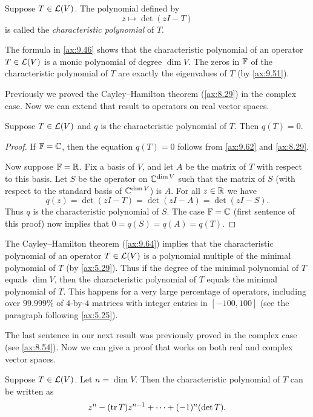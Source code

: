 \begin{definition}\label{ax:9.63}
Suppose $T\in\mathcal{L}(V)$. The polynomial defined by
\[ z\mapsto\det(zI-T) \]
is called the \emph{characteristic polynomial} of $T$.
\end{definition}

The formula in \ref{ax:9.46} shows that the characteristic polynomial of an
operator $T\in\mathcal{L}(V)$ is a monic polynomial of degree $\dim V$. The zeros in
$\mathbb{F}$ of the characteristic polynomial of $T$ are exactly the eigenvalues of $T$
(by \ref{ax:9.51}).

Previously we proved the Cayley--Hamilton theorem (\ref{ax:8.29}) in the
complex case. Now we can extend that result to operators on real vector spaces.

\begin{result}\label{ax:9.64}
Suppose $T\in\mathcal{L}(V)$ and $q$ is the characteristic polynomial of $T$. Then
$q(T)=0$.
\end{result}

\begin{proof}
If $\mathbb{F}=\mathbb{C}$, then the equation $q(T)=0$ follows from \ref{ax:9.62} and
\ref{ax:8.29}.

Now suppose $\mathbb{F}=\mathbb{R}$. Fix a basis of $V$, and let $A$ be the matrix of $T$ with
respect to this basis. Let $S$ be the operator on $\mathbb{C}^{\operatorname{dim} V}$ such that the
matrix of $S$ (with respect to the standard basis of $\mathbb{C}^{\operatorname{dim} V}$) is $A$. For
all $z\in\mathbb{R}$ we have
\[ q(z) = \det(zI-T) = \det(zI-A) = \det(zI-S). \]
Thus $q$ is the characteristic polynomial of $S$. The case $\mathbb{F}=\mathbb{C}$ (first
sentence of this proof) now implies that $0=q(S)=q(A)=q(T)$.
\end{proof}

The Cayley--Hamilton theorem (\ref{ax:9.64}) implies that the characteristic
polynomial of an operator $T\in\mathcal{L}(V)$ is a polynomial multiple of the minimal
polynomial of $T$ (by \ref{ax:5.29}). Thus if the degree of the minimal
polynomial of $T$ equals $\dim V$, then the characteristic polynomial of $T$
equals the minimal polynomial of $T$. This happens for a very large percentage
of operators, including over $99.999\%$ of $4$-by-$4$ matrices with integer
entries in $[-100,100]$ (see the paragraph following \ref{ax:5.25}).

The last sentence in our next result was previously proved in the complex case
(see \ref{ax:8.54}). Now we can give a proof that works on both real and
complex vector spaces.

\begin{result}\label{ax:9.65}
Suppose $T\in\mathcal{L}(V)$. Let $n=\dim V$. Then the characteristic polynomial of
$T$ can be written as
\[ z^n - (\operatorname{tr} T)z^{n-1} + \cdots + (-1)^n(\operatorname{det} T). \]
\end{result}

